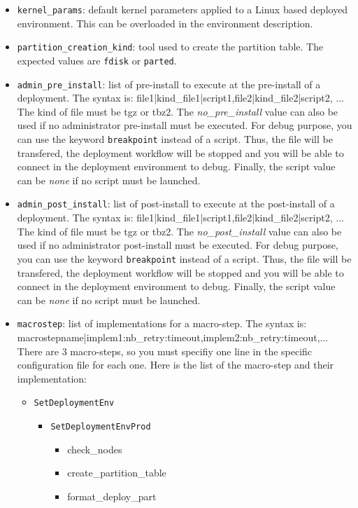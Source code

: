 \documentclass[a4wide,10pt,oneside]{book}
\begin{document}
\begin{itemize}
\item \texttt{kernel\_params}: default kernel parameters applied to a Linux based deployed environment. This can be overloaded in the environment description.
\item \texttt{partition\_creation\_kind}: tool used to create the partition table. The expected values are \texttt{fdisk} or \texttt{parted}.
\item \texttt{admin\_pre\_install}: list of pre-install to execute at the pre-install of a deployment. The syntax is: file1|kind\_file1|script1,file2|kind\_file2|script2, ... The kind of file must be tgz or tbz2. The \textit{no\_pre\_install} value can also be used if no administrator pre-install must be executed. For debug purpose, you can use the keyword \texttt{breakpoint} instead of a script. Thus, the file will be transfered, the deployment workflow will be stopped and you will be able to connect in the deployment environment to debug. Finally, the script value can be \textit{none} if no script must be launched.
\item \texttt{admin\_post\_install}: list of post-install to execute at the post-install of a deployment. The syntax is: file1|kind\_file1|script1,file2|kind\_file2|script2, ... The kind of file must be tgz or tbz2. The \textit{no\_post\_install} value can also be used if no administrator post-install must be executed. For debug purpose, you can use the keyword \texttt{breakpoint} instead of a script. Thus, the file will be transfered, the deployment workflow will be stopped and you will be able to connect in the deployment environment to debug. Finally, the script value can be \textit{none} if no script must be launched.
\item \texttt{macrostep}: list of implementations for a macro-step. The syntax is: macrostepname|implem1:nb\_retry:timeout,implem2:nb\_retry:timeout,... There are 3 macro-steps, so you must specifiy one line in the specific configuration file for each one. Here is the list of the macro-step and their implementation:
  \begin{itemize}
  \item \texttt{SetDeploymentEnv}
    \begin{itemize}
    \item \texttt{SetDeploymentEnvProd}
      \begin{itemize}
      \item check\_nodes
      \item create\_partition\_table
      \item format\_deploy\_part

\end{itemize}
\end{itemize}
\end{itemize}
\end{itemize}
\end{document}
